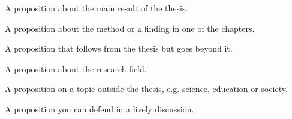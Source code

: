 \documentclass[edition=printer, version=final]{thesis} %
\newif\ifdutchversion
\begin{document}

\begin{propositionlist}
    \item A proposition about the main result of the thesis.
    \item A proposition about the method or a finding in one of the chapters.
    \item A proposition that follows from the thesis but goes beyond it.
    \item A proposition about the research field.
    \item A proposition on a topic outside the thesis, e.g. science, education or society.
    \item A proposition you can defend in a lively discussion.
\end{propositionlist}


\ifdutchversion
\clearpage
\begin{otherlanguage}{dutch}
\propositionshead{Stellingen}{behorende bij het proefschrift}{door}

\begin{propositionlist}
    \item Een stelling over het belangrijkste resultaat van het proefschrift.
    \item Een stelling over de methode of een bevinding in een van de hoofdstukken.
    \item Een stelling die volgt uit het proefschrift, maar verder gaat.
    \item Een stelling over het onderzoeksveld.
    \item Een stelling over een onderwerp buiten het proefschrift, bijvoorbeeld wetenschap, onderwijs of samenleving.
    \item Een stelling die u in een levendige discussie kunt verdedigen.
\end{propositionlist}

\approval{Deze stellingen worden opponeerbaar en verdedigbaar geacht en zijn als zodanig goedgekeurd door
    \thesispromotorsdutch.}
\end{otherlanguage}
\fi
\end{document}
